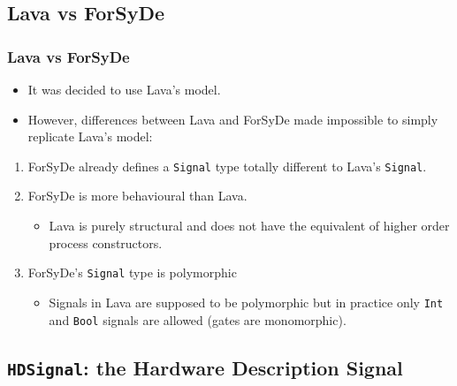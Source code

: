 \documentclass{beamer}
\begin{document}
\subsection{Lava vs ForSyDe}

\begin{frame}
  \frametitle{Lava vs ForSyDe}
  \begin{itemize}
    \item It was decided to use Lava's model.
    \item However, differences between Lava and ForSyDe made impossible to
      simply replicate Lava's model:
    \end{itemize}
      \begin{enumerate}[1)]
      \item ForSyDe already defines a \texttt{Signal} type totally
        different to Lava's \texttt{Signal}.
      \pause
      \item ForSyDe is more behavioural than Lava.
        \begin{itemize}
          \item Lava is purely structural and does not have the equivalent
            of higher order process constructors.
        \end{itemize}
        \pause
      \item ForSyDe's \texttt{Signal} type is polymorphic
      \begin{itemize}
      \item Signals in Lava are supposed to be polymorphic but in
        practice only \texttt{Int} and \texttt{Bool} signals are
        allowed (gates are monomorphic).
        \end{itemize}
      \end{enumerate}
\end{frame}

\beamerdefaultoverlayspecification{<+->}
\subsection{\texttt{HDSignal}: the Hardware Description Signal}
\end{document}
